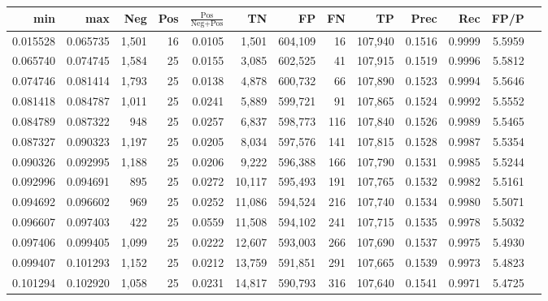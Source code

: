\begin{tabular}{rrrrrrrrrrrrr}
\toprule
     min &      max &   Neg & Pos & $\frac{\text{Pos}}{\text{Neg}+\text{Pos}}$ &      TN &      FP &      FN &      TP &   Prec &    Rec &   FP/P \\
\midrule
0.015528 & 0.065735 & 1,501 &  16 &                                     0.0105 &   1,501 & 604,109 &      16 & 107,940 & 0.1516 & 0.9999 & 5.5959 \\
0.065740 & 0.074745 & 1,584 &  25 &                                     0.0155 &   3,085 & 602,525 &      41 & 107,915 & 0.1519 & 0.9996 & 5.5812 \\
0.074746 & 0.081414 & 1,793 &  25 &                                     0.0138 &   4,878 & 600,732 &      66 & 107,890 & 0.1523 & 0.9994 & 5.5646 \\
0.081418 & 0.084787 & 1,011 &  25 &                                     0.0241 &   5,889 & 599,721 &      91 & 107,865 & 0.1524 & 0.9992 & 5.5552 \\
0.084789 & 0.087322 &   948 &  25 &                                     0.0257 &   6,837 & 598,773 &     116 & 107,840 & 0.1526 & 0.9989 & 5.5465 \\
0.087327 & 0.090323 & 1,197 &  25 &                                     0.0205 &   8,034 & 597,576 &     141 & 107,815 & 0.1528 & 0.9987 & 5.5354 \\
0.090326 & 0.092995 & 1,188 &  25 &                                     0.0206 &   9,222 & 596,388 &     166 & 107,790 & 0.1531 & 0.9985 & 5.5244 \\
0.092996 & 0.094691 &   895 &  25 &                                     0.0272 &  10,117 & 595,493 &     191 & 107,765 & 0.1532 & 0.9982 & 5.5161 \\
0.094692 & 0.096602 &   969 &  25 &                                     0.0252 &  11,086 & 594,524 &     216 & 107,740 & 0.1534 & 0.9980 & 5.5071 \\
0.096607 & 0.097403 &   422 &  25 &                                     0.0559 &  11,508 & 594,102 &     241 & 107,715 & 0.1535 & 0.9978 & 5.5032 \\
0.097406 & 0.099405 & 1,099 &  25 &                                     0.0222 &  12,607 & 593,003 &     266 & 107,690 & 0.1537 & 0.9975 & 5.4930 \\
0.099407 & 0.101293 & 1,152 &  25 &                                     0.0212 &  13,759 & 591,851 &     291 & 107,665 & 0.1539 & 0.9973 & 5.4823 \\
0.101294 & 0.102920 & 1,058 &  25 &                                     0.0231 &  14,817 & 590,793 &     316 & 107,640 & 0.1541 & 0.9971 & 5.4725 \\

\end{tabular}
